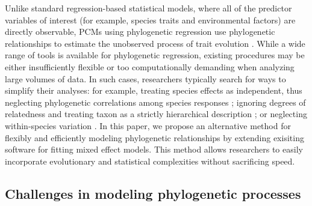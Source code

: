 \documentclass[12pt]{article}
\begin{document}
Unlike standard regression-based statistical models, where all of the predictor variables of interest (for example, species traits and environmental factors) are directly observable,  PCMs using phylogenetic regression use phylogenetic relationships to estimate the unobserved process of trait evolution \citep{felsenstein1985phylogenies, butler2004phylogenetic, hansen2012interpreting}. 
While a wide range of tools is available for phylogenetic regression, existing procedures may be either insufficiently flexible or too computationally demanding when analyzing large volumes of data.
In such cases, researchers typically search for ways to simplify their analyses: for example, treating species effects as independent, thus neglecting phylogenetic correlations among species responses \citep{bunnefeld2012island}; ignoring degrees of relatedness and treating taxon as a strictly hierarchical description \citep{tella1999habitat}; or neglecting within-species variation \citep{ord2010adaptation}.
In this paper, we propose an alternative method for flexibly and efficiently modeling phylogenetic relationships by extending exisiting software for fitting mixed effect models. 
This method allows researchers to easily incorporate evolutionary and statistical complexities without sacrificing speed.

\subsection*{Challenges in modeling phylogenetic processes}
\end{document}
